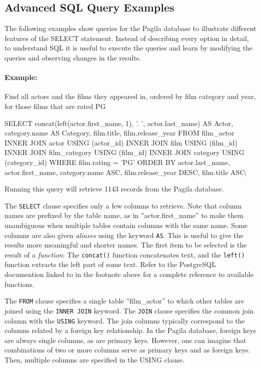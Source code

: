 \begin{withcode}
\subsection*{Advanced SQL Query Examples}

The following examples show queries for the Pagila database to illustrate different features of the SELECT statement. Instead of describing every option in detail, to understand SQL it is useful to execute the queries and learn by modifying the queries and observing changes in the results. 

\paragraph{Example:} Find all actors and the films they appeared in, ordered by film category and year, for those films that are rated PG

\begin{sqlcode}
SELECT concat(left(actor.first_name, 1), '. ', 
           actor.last_name) AS Actor, 
       category.name AS Category, 
       film.title, 
       film.release_year
  FROM film_actor
  INNER JOIN actor USING (actor_id)
  INNER JOIN film USING (film_id)
  INNER JOIN film_category USING (film_id)
  INNER JOIN category USING (category_id)
  WHERE film.rating = 'PG'
  ORDER BY actor.last_name, 
           actor.first_name, 
           category.name ASC, 
           film.release_year DESC, 
           film.title ASC;
\end{sqlcode}

Running this query will retrieve 1143 records from the Pagila database. 

The \texttt{SELECT} clause specifies only a few columns to retrieve. Note that column names are prefixed by the table name, as in ''actor.first\_name'' to make them unambiguous when multiple tables contain columns with the same name. Some columns are also given \emph{aliases} using the keyword \texttt{AS}. This is useful to give the results more meaningful and shorter names. The first item to be selected is the result of a \emph{function}: The \texttt{concat()} function concatenates text, and the \texttt{left()} function extracts the left part of some text. Refer to the PostgreSQL documention linked to in the footnote above for a complete reference to available functions. 

The \texttt{FROM} clause specifies a single table ''film\_actor'' to which other tables are joined using the \texttt{INNER JOIN} keyword. The \texttt{JOIN} clause specifies the common join column with the \texttt{USING} keyword. The join columns typically correspond to the columns related by a foreign key relationship. In the Pagila database, foreign keys are always single columns, as are primary keys. However, one can imagine that combinations of two or more columns serve as primary keys and as foreign keys. Then, multiple columns are specified in the USING clause.


\end{withcode}
